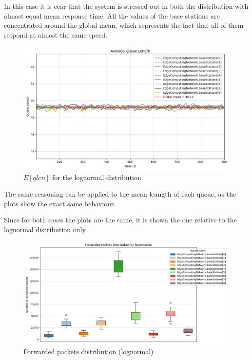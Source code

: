 \documentclass{report}
\begin{document}
In this case it is cear that the system is stressed out in both the distribution with almost equal mean response time. All the values of the base stations are concentrated around the global mean, which represents the fact that all of them respond at almost the same speed.

\begin{figure}[H]
    \centering
    \includegraphics[width=\textwidth]{img/plots/log_1e4_B/qlen.png}
    \caption{$E[qlen]$ for the lognormal distribution}
\end{figure}


The same reasoning can be applied to the mean leangth of each queue, as the plots show the exact same behaviour.

Since for both cases the plots are the same, it is shown the one relative to the lognormal distribution only.

\begin{figure}[H]
    \centering
    \includegraphics[width=\textwidth]{img/plots/log_1e4_B/forwarded.png}
    \caption{Forwarded packets distribution (lognormal)}
\end{figure}
\end{document}
